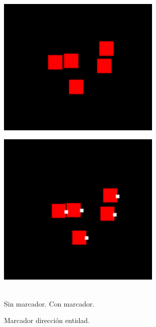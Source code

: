 \begin{figure}[ht]
\centering
\begin{minipage}[c]{0.42\linewidth}
	\hspace{9mm}
	\includegraphics[width=0.7\textwidth]{imagenes/diario_desarrollo/sin-marcador.png} \\
	\label{sin_marcador}
\end{minipage}
\begin{minipage}[c]{0.40\linewidth}
	\hspace{9mm}
	\includegraphics[width=0.7\textwidth]{imagenes/diario_desarrollo/marcador.png} \\
	\label{marcador}
\end{minipage} \\
	\hspace{0.5cm} Sin marcador. \hspace{3.5cm} Con marcador. 
\caption{Marcador dirección entidad.}
\end{figure}

